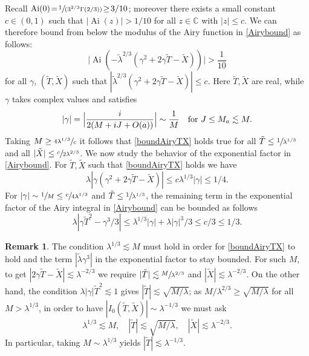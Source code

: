 \documentclass[11pt]{article}
\newcommand{\spfrac}[2]{\sfrac{#1}{(#2)}}
\DeclareMathOperator{\Ai}{Ai}
\theoremstyle{plain}
\theoremstyle{definition}
\newtheorem{rmq}{Remark}[section]
\begin{document}
Recall $\Ai(0)\!=\!\spfrac{1}{3^{2/3}\Gamma(2/3)}\!\geq\!3/10$; moreover there exists a small constant $c\!\in\!(0,1)$ such that $|\Ai(z)|>1/10$ for all $z\in\mathbb{C}$ with $|z|\leq c$. We can therefore bound from below the modulus of the Airy function in \eqref{Airybound} as follows:
\begin{equation}\label{boundAiryTX}
\bigl|\Ai(-\tilde\lambda^{2/3}(\gamma^2+2\gamma \tilde T-\tilde X))\bigr|>\frac 1 {10}
\end{equation}
for all $\gamma$, $(\tilde T,\tilde X)$ such that $|\tilde\lambda^{2/3}(\gamma^2+2\gamma \tilde T-\tilde X)|\leq c$. Here $\tilde T,\tilde X$ are real, while $\gamma$ takes complex values and satisfies
\[
|\gamma|= \Bigl |\frac{i}{2(M+iJ+O(a))}\Bigr|\sim \frac{1}{M}\quad\text{for }J\leq M_a\lesssim M.
\]
Taking $M\geq \sfrac{4\lambda^{1/3}}{c}$ it follows that \eqref{boundAiryTX} holds true for all $\tilde T\leq \sfrac{1}{\lambda^{1/3}}$ and all $|\tilde X|\leq \sfrac{c}{2\lambda^{2/3}}$.
We now study the behavior of the exponential factor in \eqref{Airybound}. For $\tilde T,\tilde X$ such that \eqref{boundAiryTX} holds we have
\[
\lambda |\gamma(\gamma^2+2\gamma \tilde T-\tilde X)|\leq c\lambda^{1/3}|\gamma|\leq 1/4.
\]
For $|\gamma|\sim \sfrac{1}{M}\leq \sfrac{c}{4\lambda^{1/3}}$ and $\tilde T\leq \sfrac{1}{\lambda^{1/3}}$, the remaining term in the exponential factor of the Airy integral in \eqref{Airybound} can be bounded as follows
\begin{equation}\label{condT}
\lambda |\gamma \tilde T^2-\gamma^3/3|\leq \lambda^{1/3}|\gamma|+\lambda |\gamma|^3/3\leq c/3\leq 1/3.
\end{equation}
\begin{rmq}
The condition $\lambda^{1/3}\lesssim M$ must hold in order for \eqref{boundAiryTX} to hold and the term $|\tilde\lambda\gamma^3|$ in the exponential factor to stay bounded. For such $M$, to get $|2\gamma \tilde T-\tilde X|\lesssim \lambda^{-2/3}$ we require $|\tilde T|\lesssim \sfrac{M}{\lambda^{2/3}}$ and $|\tilde X |\lesssim \lambda^{-2/3}$. On the other hand, the condition $\lambda |\gamma|\tilde T^2\lesssim 1$ gives $|\tilde T|\lesssim \sqrt{M/\lambda}$; as $M/\lambda^{2/3}\geq \sqrt{M/\lambda}$ for all $M>\lambda^{1/3}$, in order to have $|I_0(\tilde T,\tilde X)|\sim \lambda^{-1/3}$ we must ask
\begin{equation}\label{condTX}
\lambda^{1/3}\lesssim M,\quad |\tilde T|\lesssim \sqrt{M/\lambda}, \quad |\tilde X|\lesssim \lambda^{-2/3}.
\end{equation}
In particular, taking $M\sim \lambda^{1/3}$ yields $|\tilde T|\lesssim \lambda^{-1/3}$.
\end{rmq}
\end{document}
